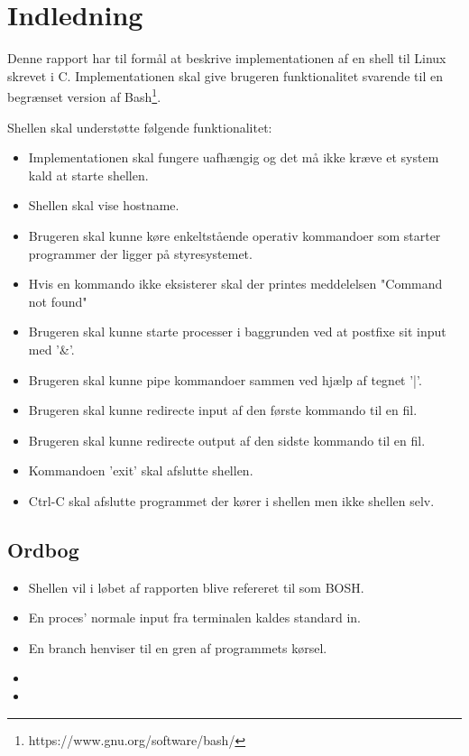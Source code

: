 \section{Indledning}
Denne rapport har til formål at beskrive implementationen af en shell til Linux skrevet i C. Implementationen skal give brugeren funktionalitet svarende til en begrænset version af Bash\footnote{https://www.gnu.org/software/bash/}. 

Shellen skal understøtte følgende funktionalitet:
\begin{itemize}
	\item Implementationen skal fungere uafhængig og det må ikke kræve et system kald at starte shellen.
	\item Shellen skal vise hostname.
	\item Brugeren skal kunne køre enkeltstående operativ kommandoer som starter programmer der ligger på styresystemet.
	\item Hvis en kommando ikke eksisterer skal der printes meddelelsen "Command not found"
	\item Brugeren skal kunne starte processer i baggrunden ved at postfixe sit input med '\&'.
	\item Brugeren skal kunne pipe kommandoer sammen ved hjælp af tegnet '|'.
	\item Brugeren skal kunne redirecte input af den første kommando til en fil.
	\item Brugeren skal kunne redirecte output af den sidste kommando til en fil.
	\item Kommandoen 'exit' skal afslutte shellen.
	\item Ctrl-C skal afslutte programmet der kører i shellen men ikke shellen selv.
\end{itemize}

\subsection{Ordbog}
\begin{itemize}
	\item Shellen vil i løbet af rapporten blive refereret til som BOSH.
	\item En proces' normale input fra terminalen kaldes standard in.
	\item En branch henviser til en gren af programmets kørsel.
	\item {}
	\item {}
\end{itemize}


